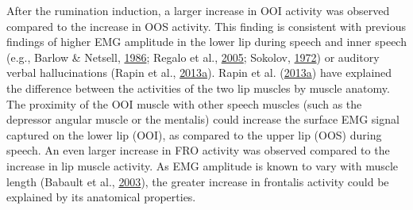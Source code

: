 \documentclass[a4paper,12pt,twoside,openright,oldfontcommands]{memoir}
\begin{document}
After the rumination induction, a larger increase in OOI activity was observed compared to the increase in OOS activity. This finding is consistent with previous findings of higher EMG amplitude in the lower lip during speech and inner speech (e.g., Barlow \& Netsell, \protect\hyperlink{ref-barlow_differential_1986}{1986}; Regalo et al., \protect\hyperlink{ref-regalo_electromyographic_2005}{2005}; Sokolov, \protect\hyperlink{ref-sokolov_inner_1972}{1972}) or auditory verbal hallucinations (Rapin et al., \protect\hyperlink{ref-rapin_emg_2013}{2013}\protect\hyperlink{ref-rapin_emg_2013}{a}). Rapin et al. (\protect\hyperlink{ref-rapin_emg_2013}{2013}\protect\hyperlink{ref-rapin_emg_2013}{a}) have explained the difference between the activities of the two lip muscles by muscle anatomy. The proximity of the OOI muscle with other speech muscles (such as the depressor angular muscle or the mentalis) could increase the surface EMG signal captured on the lower lip (OOI), as compared to the upper lip (OOS) during speech. An even larger increase in FRO activity was observed compared to the increase in lip muscle activity. As EMG amplitude is known to vary with muscle length (Babault et al., \protect\hyperlink{ref-babault_effect_2003}{2003}), the greater increase in frontalis activity could be explained by its anatomical properties.
\end{document}
